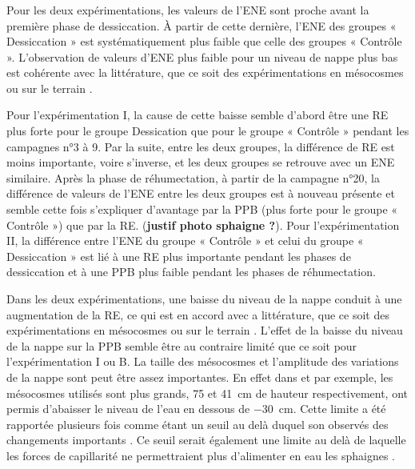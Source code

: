 \subsubsection{\coo}

Pour les deux expérimentations, les valeurs de l'ENE sont proche avant la première phase de dessiccation.
À partir de cette dernière, l'ENE des groupes « Dessiccation » est systématiquement plus faible que celle des groupes « Contrôle ».
L'observation de valeurs d'ENE plus faible pour un niveau de nappe plus bas est cohérente avec la littérature, que ce soit des expérimentations en mésocosmes \citet{aerts1997,blodau2004} ou sur le terrain \citet{bubier2003,sonnentag2010}.

Pour l'expérimentation I, la cause de cette baisse semble d'abord être une RE plus forte pour le groupe Dessication que pour le groupe « Contrôle » pendant les campagnes n°3 à 9.
Par la suite, entre les deux groupes, la différence de RE est moins importante, voire s'inverse, et les deux groupes se retrouve avec un ENE similaire.
Après la phase de réhumectation, à partir de la campagne n°20, la différence de valeurs de l'ENE entre les deux groupes est à nouveau présente et semble cette fois s'expliquer d'avantage par la PPB (plus forte pour le groupe « Contrôle ») que par la RE. (\textbf{justif photo sphaigne ?}).
Pour l'expérimentation II, la différence entre l'ENE du groupe « Contrôle » et celui du groupe « Dessiccation » est lié à une RE plus importante pendant les phases de dessiccation et à une PPB plus faible pendant les phases de réhumectation.

Dans les deux expérimentations, une baisse du niveau de la nappe conduit à une augmentation de la RE, ce qui est en accord avec a littérature, que ce soit des expérimentations en mésocosmes \citet{blodau2004,dinsmore2009} ou sur le terrain \citet{ballantyne2014}. 
L'effet de la baisse du niveau de la nappe sur la PPB semble être au contraire limité que ce soit pour l'expérimentation I ou B.
La taille des mésocosmes et l'amplitude des variations de la nappe sont peut être assez importantes.
En effet dans \citet{blodau2004} et \citet{dinsmore2009} par exemple, les mésocosmes utilisés sont plus grands, 75 et \SI{41}{\centi\metre} de hauteur respectivement, ont permis d'abaisser le niveau de l'eau en dessous de \SI{-30}{\centi\metre}.
Cette limite a été rapportée plusieurs fois comme étant un seuil au delà duquel son observés des changements importants \citep{blodau2004,peichl2014}.
Ce seuil serait également une limite au delà de laquelle les forces de capillarité ne permettraient plus d'alimenter en eau les sphaignes \citep{rydin2013a,ketcheson2014}.

